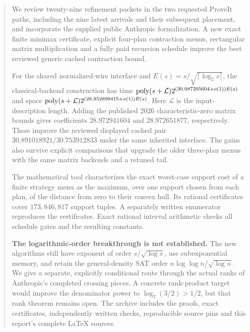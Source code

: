\begin{abstract}
We review twenty-nine refinement packets in the two requested ProveIt
paths, including the nine latest arrivals and their subsequent placement,
and incorporate the supplied public Anthropic formalization. A new exact
finite minimax certificate, explicit four-plan contraction menus, rectangular
matrix multiplication and a fully paid recursion schedule improve the
best reviewed generic cached contraction bound.

For the shared normalized-wire interface and
$E(s)=s/\sqrt{\lceil\log_2s\rceil}$, the classical-backend construction has
time $\poly(s+\mathcal L)2^{(30.087205604+o(1))E(s)}$ and space
$\poly(s+\mathcal L)2^{(28.852899415+o(1))E(s)}$.
Here $\mathcal L$ is the input-description length.
Adding the published 2026 characteristic-zero matrix bounds gives
coefficients $28.972941604$ and $28.972651877$, respectively.
These improve the reviewed displayed cached pair
$30.891018921/30.753912833$ under the same inherited interface.
The gains also survive explicit comparisons that upgrade the older
three-plan menus with the same matrix backends and a retuned tail.

The mathematical tool characterizes the exact worst-case support cost of
a finite strategy menu as the maximum, over one support chosen from each
plan, of the distance from zero to their convex hull. Its rational
certificates cover $173{,}846{,}817$ support tuples. A separately written
enumerator reproduces the certificates. Exact rational interval arithmetic
checks all schedule gates and the resulting constants.

\textbf{The logarithmic-order breakthrough is not established.}
The new algorithms still have exponent of order
$s/\sqrt{\log s}$, use subexponential memory, and retain the general-density
SAT order $n\log\log n/\sqrt{\log n}$. We give a separate, explicitly
conditional route through the actual ranks of Anthropic's completed
crossing pieces. A concrete rank-product target would improve the
denominator power to $\log_2(3/2)>1/2$, but that rank theorem remains open.
The archive includes the proofs, exact certificates, independently written
checks, reproducible source pins and this report's complete LaTeX sources.
\end{abstract}

